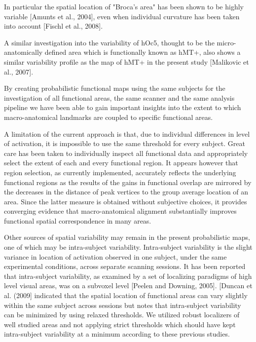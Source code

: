 %
In particular the spatial location of "Broca's area" has been shown to be highly
variable [Amunts et al., 2004], even when individual curvature has been taken
into account [Fischl et al., 2008].

%
A similar investigation into the variability of hOc5, thought to be the
micro-anatomically defined area which is functionally known as hMT+, also shows
a similar variability profile as the map of hMT+ in the present study [Malikovic
et al., 2007].

%
By creating probabilistic functional maps using the same subjects for the
investigation of all functional areas, the same scanner and the same analysis
pipeline we have been able to gain important insights into the extent to which
macro-anatomical landmarks are coupled to specific functional areas.

%
A limitation of the current approach is that, due to individual differences in
level of activation, it is impossible to use the same threshold for every
subject.
%
Great care has been taken to individually inspect all functional data and
appropriately select the extent of each and every functional region.
%
It appears however that region selection, as currently implemented, accurately
reflects the underlying functional regions as the results of the gains in
functional overlap are mirrored by the decreases in the distance of peak
vertices to the group average location of an area.
%
Since the latter measure is obtained without subjective choices, it provides
converging evidence that macro-anatomical alignment substantially improves
functional spatial correspondence in many areas.

Other sources of spatial variability may remain in the present probabilistic
maps, one of which may be intra-subject variability.
%
Intra-subject variability is the slight variance in location of activation
observed in one subject, under the same experimental conditions, across separate
scanning sessions.
%
It has been reported that intra-subject variability, as examined by a set of
localizing paradigms of high level visual areas, was on a subvoxel level [Peelen
and Downing, 2005].
%
[Duncan et al. (2009] indicated that the spatial location of functional areas
can vary slightly within the same subject across sessions but notes that
intra-subject variability can be minimized by using relaxed thresholds.
%
We utilized robust localizers of well studied areas and not applying strict
thresholds which should have kept intra-subject variability at a minimum
according to these previous studies.

